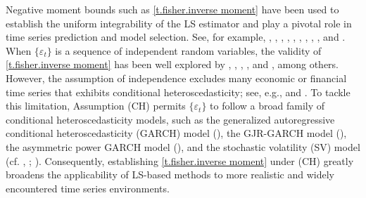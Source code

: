 \documentclass[ejsv2]{imsart}
\theoremstyle{plain}
\theoremstyle{definition}
\theoremstyle{remark}
\begin{document}
Negative moment bounds such as \eqref{t.fisher.inverse moment} have been used to
establish the uniform integrability of the LS estimator and play a pivotal role in time series prediction and model selection. See, for example, 
\cite{Fuller1981}, \cite{Kunitomo1985a},
\cite{Lewis1988}, \cite{Shaman1988},
\cite{Ing2003},  \cite{Scho2005},
\cite{Chan2011},  \cite{Ryan2013},
\cite{W2016}, and \cite{Chi2021}.
When $\{\varepsilon_t\}$ is a sequence of independent random variables,
the validity of
\eqref{t.fisher.inverse moment} has been well explored by \cite{Bhansali1991}, 
\cite{Papangelou1994},
\cite{Findley2002},
\cite{Ing2003}, and
\cite{Chan2011}, among others.
However, 
the assumption of independence excludes
many economic or financial time series that exhibits
conditional heteroscedasticity; see, e.g., \cite{Bollerslev1994} %
and \cite{Tsay2010}.
To tackle this limitation, Assumption (CH) permits
$\{\varepsilon_t\}$ to follow a broad family of conditional heteroscedasticity models,
such as the generalized autoregressive
conditional heteroscedasticity (GARCH) model (\citealp{Bollerslev1986}), the GJR-GARCH model
(\citealp{Glosten1993}), the asymmetric power GARCH model (\citealp{Ding1993}), and the stochastic volatility (SV) model
(cf. \citealp{Taylor1982}, \citeyear{Taylor1986}; \citealp{Tsay2010}).
Consequently, establishing \eqref{t.fisher.inverse moment} under (CH)
greatly broadens the applicability of LS-based methods to more realistic and widely encountered time series environments.
\end{document}

